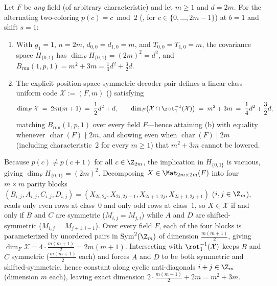 \begin{theorem}\label{thm:1a-sharpness}
Let $F$ be \emph{any} field (of arbitrary characteristic) and let $m \ge 1$ and $d = 2m$. For the
alternating two-coloring $p(c) = c \bmod 2$ (, for $c \in \{0,\dots,2m-1\}$) at
$b = 1$ and shift $s = 1$:
\begin{enumerate}[label=(\alph*)]
\item With $g_1 = 1$, $n = 2m$, $d_{0,0} = d_{1,0} = m$, and $T_{0,0} = T_{1,0} = m$, the
  covariance space $H_{\{0,1\}}$ has $\dim_F H_{\{0,1\}} = (2m)^2 = d^2$, and
  $B_{\mathrm{run}}(1, p, 1) = m^2 + 3m = \frac{1}{4}d^2 + \frac{3}{2}d$.
\item The explicit position-space symmetric decoder pair  defines a
  linear class-uniform code $\mathcal{X} := {}$$(F, m)$
  () satisfying
  \[
    \dim_F \mathcal{X} \;=\; 2m(m + 1) \;=\; \frac{1}{2}d^2 + d,
    \qquad
    \dim_F\bigl(\mathcal{X} \cap \rot_1^{-1}(\mathcal{X})\bigr)
    \;=\;
    m^2 + 3m
    \;=\;
    \frac{1}{4}d^2 + \frac{3}{2}d,
  \]
  matching $B_{\mathrm{run}}(1, p, 1)$ over every field $F$---hence attaining
  (b) with equality whenever $\operatorname{char}(F) \nmid 2m$, and showing
  even when $\operatorname{char}(F) \mid 2m$ (including characteristic~$2$ for every $m \ge 1$) that
  $m^2 + 3m$ cannot be lowered.
\end{enumerate}
\end{theorem}
\begin{outline}
Because $p(c) \ne p(c + 1)$ for all $c \in \Z_{2m}$, the implication in $H_{\{0,1\}}$ is vacuous,
giving $\dim_F H_{\{0,1\}} = (2m)^2$. Decomposing $X \in \Mat_{2m\times 2m}(F)$ into four $m \times m$
parity blocks $(B_{i,j}, A_{i,j}, C_{i,j}, D_{i,j}) = (X_{2i,2j}, X_{2i,2j+1}, X_{2i+1,2j},
X_{2i+1,2j+1})$ ($i, j \in \Z_m$),  reads only even rows at class~$0$ and
only odd rows at class~$1$, so $X \in \mathcal{X}$ if and only if $B$ and $C$ are symmetric
($M_{i,j} = M_{j,i}$) while $A$ and $D$ are shifted-symmetric ($M_{i,j} = M_{j+1, i-1}$). Over every
field $F$, each of the four blocks is parameterized by unordered pairs in $\mathrm{Sym}^2(\Z_m)$ of
dimension $\frac{m(m+1)}{2}$, giving $\dim_F \mathcal{X} = 4 \cdot \frac{m(m+1)}{2} = 2m(m+1)$.
Intersecting with $\rot_1^{-1}(\mathcal{X})$ keeps $B$ and $C$ symmetric ($\frac{m(m+1)}{2}$ each) and
forces $A$ and $D$ to be both symmetric and shifted-symmetric, hence constant along cyclic
anti-diagonals $i + j \in \Z_m$ (dimension $m$ each), leaving exact dimension
$2 \cdot \frac{m(m+1)}{2} + 2m = m^2 + 3m$.
\end{outline}

